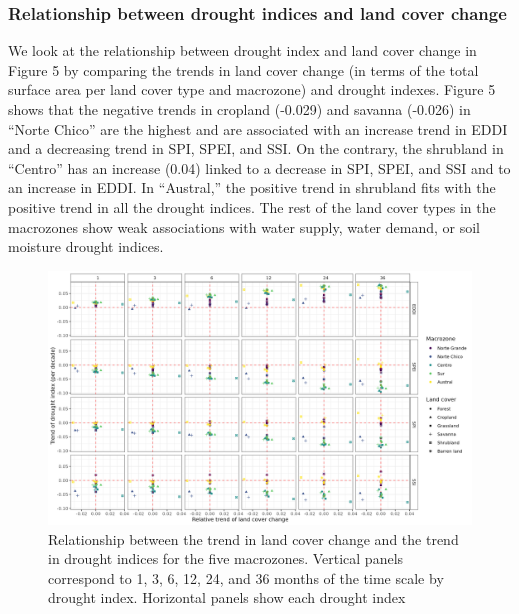 \documentclass[
  authoryear,
  preprint,
  3p,
  onecolumn]{elsarticle}
\begin{document}
\hypertarget{relationship-between-drought-indices-and-land-cover-change}{%
\subsubsection{Relationship between drought indices and land cover
change}\label{relationship-between-drought-indices-and-land-cover-change}}

We look at the relationship between drought index and land cover change
in Figure 5 by comparing the trends in land cover change (in terms of
the total surface area per land cover type and macrozone) and drought
indexes. Figure 5 shows that the negative trends in cropland (-0.029)
and savanna (-0.026) in ``Norte Chico'' are the highest and are
associated with an increase trend in EDDI and a decreasing trend in SPI,
SPEI, and SSI. On the contrary, the shrubland in ``Centro'' has an
increase (0.04) linked to a decrease in SPI, SPEI, and SSI and to an
increase in EDDI. In ``Austral,'' the positive trend in shrubland fits
with the positive trend in all the drought indices. The rest of the land
cover types in the macrozones show weak associations with water supply,
water demand, or soil moisture drought indices.

\begin{figure}[!ht]

{\centering \includegraphics{../output/figs/points_landcover_drought_indices_trend_and_time_scale.png}

}

\caption{Relationship between the trend in land cover change and the
trend in drought indices for the five macrozones. Vertical panels
correspond to 1, 3, 6, 12, 24, and 36 months of the time scale by
drought index. Horizontal panels show each drought index}

\end{figure}
\end{document}
